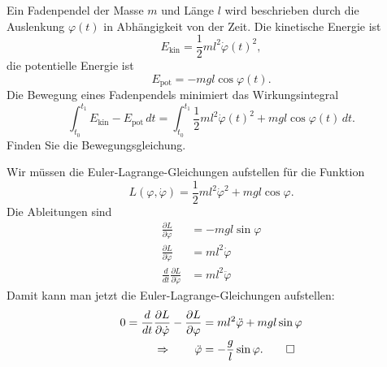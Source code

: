 Ein Fadenpendel der Masse $m$ und Länge $l$ wird beschrieben durch
die Auslenkung $\varphi(t)$ in Abhängigkeit von der Zeit. 
Die kinetische Energie ist 
\[
E_{\text{kin}}
=
\frac12ml^2\dot\varphi(t)^2,
\]
die potentielle Energie ist
\[
E_{\text{pot}}
=
-mgl\cos\varphi(t).
\]
Die Bewegung eines Fadenpendels minimiert das Wirkungsintegral
\[
\int_{t_0}^{t_1}
E_{\text{kin}}-E_{\text{pot}}
\,dt
=
\int_{t_0}^{t_1}
\frac12ml^2\dot\varphi(t)^2
+
mgl\cos\varphi(t)
\,dt.
\]
Finden Sie die Bewegungsgleichung.

\begin{loesung}
Wir müssen die Euler-Lagrange-Gleichungen aufstellen für die
Funktion
\[
L(\varphi, \dot\varphi)
=
\frac12ml^2\dot\varphi^2
+
mgl\cos\varphi.
\]
Die Ableitungen sind
\begin{align*}
\frac{\partial L}{\partial\varphi}
&=
-mgl\sin\varphi
\\
\frac{\partial L}{\partial\dot\varphi}
&=
ml^2\dot\varphi
\\
\frac{d}{dt}
\frac{\partial L}{\partial\dot\varphi}
&=
ml^2\ddot\varphi
\end{align*}
Damit kann man jetzt die Euler-Lagrange-Gleichungen aufstellen:
\begin{align*}
0=
\frac{d}{dt}
\frac{\partial L}{\partial\dot\varphi}
-
\frac{\partial L}{\partial\varphi}
&=
ml^2\ddot\varphi
+
mgl\sin\varphi
\\
\Rightarrow\qquad
\ddot\varphi
&=
-\frac{g}{l}\sin\varphi.
\qedhere
\end{align*}
\end{loesung}


